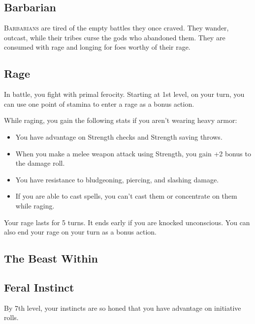 
\begin{multicols*}{2}



\section{Barbarian}

\lettrine[lines=3, lhang=0.15, loversize=0.25, findent=.5em]{B}{arbarians} are tired of the empty battles they once craved. They wander, outcast, while their tribes curse the gods who abandoned them. They are consumed with rage and longing for foes worthy of their rage.

\subsection*{Rage}

In battle, you fight with primal ferocity. Starting at 1st level, on your turn, you can use one point of stamina to enter a rage as a bonus action.



While raging, you gain the following stats if you aren’t wearing heavy armor:


\begin{itemize}
    \item You have advantage on Strength checks and Strength saving throws.
    \item When you make a melee weapon attack using Strength, you gain +2 bonus to the damage roll. 
    \item You have resistance to bludgeoning, piercing, and slashing damage.
    \item If you are able to cast spells, you can’t cast them or concentrate on them while raging.
\end{itemize}

Your rage lasts for 5 turns. It ends early if you are knocked unconscious. You can also end your rage on your turn as a bonus action.



\subsection*{The Beast Within}

\subsection*{Feral Instinct}

By 7th level, your instincts are so honed that you have advantage on initiative rolls.


\end{multicols*}
